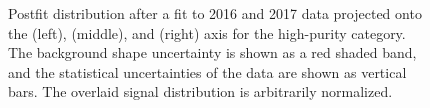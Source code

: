 \begin{figure}[h!]
\caption{Postfit distribution after a fit to 2016 and 2017 data projected onto the \MJO (left), \MJT (middle), and \MVV (right) axis for the high-purity category. The background shape uncertainty is shown as a red shaded band, and the statistical uncertainties of the data are shown as vertical bars. The overlaid signal distribution is arbitrarily normalized.}
\label{fig:searchIII:finalPostFitHP}
\end{figure}
\begin{figure}[h!]
\centering
{}
\\

\end{figure}
